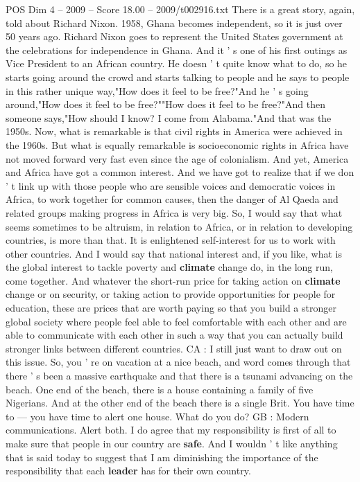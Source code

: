 \begin{textsample}{POS Dim 4 – 2009 – Score 18.00 – 2009/t002916.txt}
There is a great story, again, told about Richard Nixon. 1958, Ghana becomes independent, so it is just over 50 years ago.
Richard Nixon goes to represent the United States government at the celebrations for independence in Ghana.
And it ' s one of his first outings as Vice President to an African country.
He doesn ' t quite know what to do, so he starts going around the crowd and starts talking to people and he says to people in this rather unique way,"How does it feel to be free?"And he ' s going around,"How does it feel to be free?""How does it feel to be free?"And then someone says,"How should I know?
I come from Alabama."And that was the 1950s.
Now, what is remarkable is that civil rights in America were achieved in the 1960s.
But what is equally remarkable is socioeconomic rights in Africa have not moved forward very fast even since the age of colonialism.
And yet, America and Africa have got a common interest.
And we have got to realize that if we don ' t link up with those people who are sensible voices and democratic voices in Africa, to work together for common causes, then the danger of Al Qaeda and related groups making progress in Africa is very big.
So, I would say that what seems sometimes to be altruism, in relation to Africa, or in relation to developing countries, is more than that.
It is enlightened self-interest for us to work with other countries.
And I would say that national interest and, if you like, what is the global interest to tackle poverty and \textbf{climate} change do, in the long run, come together.
And whatever the short-run price for taking action on \textbf{climate} change or on security, or taking action to provide opportunities for people for education, these are prices that are worth paying so that you build a stronger global society where people feel able to feel comfortable with each other and are able to communicate with each other in such a way that you can actually build stronger links between different countries.
CA : I still just want to draw out on this issue.
So, you ' re on vacation at a nice beach, and word comes through that there ' s been a massive earthquake and that there is a tsunami advancing on the beach.
One end of the beach, there is a house containing a family of five Nigerians.
And at the other end of the beach there is a single Brit.
You have time to — you have time to alert one house.
What do you do?
GB : Modern communications.
Alert both.
I do agree that my responsibility is first of all to make sure that people in our country are \textbf{safe}.
And I wouldn ' t like anything that is said today to suggest that I am diminishing the importance of the responsibility that each \textbf{leader} has for their own country.

\end{textsample}
